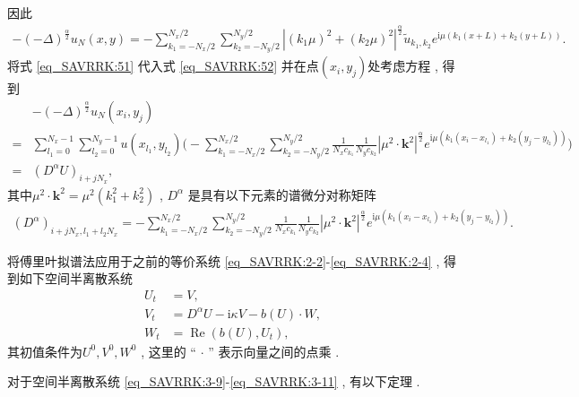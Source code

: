 因此
\begin{align}\label{eq_SAVRRK:52}
-(-\Delta)^{\frac{\alpha}{2}} u_{N}\left(x , y\right)=-\sum\limits_{k_{1}=-N_{x} / 2}^{N_{x} / 2} \sum\limits_{k_{2}=-N_{y} / 2}^{N_{y} / 2}\left|\left(k_{1} \mu\right)^{2}+\left(k_{2} \mu\right)^{2}\right|^{\frac{\alpha}{2}} \tilde{u}_{k_{1} , k_{2}} e^{\mathrm{i}\mu\left( k_{1} (x+L)+k_{2}(y+L)\right)} . 
\end{align}
将式 \eqref{eq_SAVRRK:51} 代入式 \eqref{eq_SAVRRK:52} 并在点$(x_i , y_j)$处考虑方程 , 得到
\begin{align}
&-(-\Delta)^{\frac{\alpha}{2}} u_{N}\left(x_{i} , y_{j}\right)\nonumber\\
=&\sum\limits_{l_{1}=0}^{N_{x}-1} \sum\limits_{l_{2}=0}^{N_{y}-1}u(x_{l_{1}} , y_{l_{2}})\Big(-\sum\limits_{k_{1}=-N_{x} / 2}^{N_{x} / 2} \sum\limits_{k_{2}=-N_{y} / 2}^{N_{y} / 2} \frac{1}{N_{x} c_{k_{1}}} \frac{1}{N_{y} c_{k_{2}}}\left|\mu^{2} \cdot \mathbf{k}^{2}\right|^{\frac{\alpha}{2}} e^{\mathrm{i} \mu\left(k_{1}\left(x_{i}-x_{l_{1}}\right)+k_{2}\left(y_{j}-y_{l_{2}}\right)\right)}\Big)\nonumber\\
=&\left(D^{\alpha}U\right)_{i+j N_{x}} , \label{eq_SAVRRK:53}
\end{align}
其中$\mu^{2} \cdot \mathbf{k}^{2}=\mu^{2}\left(k_{1}^{2}+k_{2}^{2}\right)$ , $D^{\alpha}$ 是具有以下元素的谱微分对称矩阵
\begin{align}\label{eq_SAVRRK:54}
\left(D^{\alpha}\right)_{i+j N_{x} , l_{1}+l_{2} N_{x}}=-\sum\limits_{k_{1}=-N_{x} / 2}^{N_{x} / 2} \sum\limits_{k_{2}=-N_{y} / 2}^{N_{y} / 2}\frac{1}{N_{x} c_{k_{1}}} \frac{1}{N_{y} c_{k_{2}}}\left|\mu^{2} \cdot \mathbf{k}^{2}\right|^{\frac{\alpha}{2}} e^{\mathrm{i}\mu\left(k_{1}\left(x_{i}-x_{l_{1}}\right)+k_{2}\left(y_{j}-y_{l_{2}}\right)\right)} . 
\end{align}

将傅里叶拟谱法应用于之前的等价系统 \eqref{eq_SAVRRK:2-2}-\eqref{eq_SAVRRK:2-4} , 得到如下空间半离散系统
\begin{align}
 U_t&=V , \label{eq_SAVRRK:3-9}\\
 V_t&=D^{\alpha} U-\mathrm{i}\kappa V- b(U) \cdot W , \label{eq_SAVRRK:3-10}\\
 W_t&=\operatorname{Re}\left(b(U) , U_t\right) , \label{eq_SAVRRK:3-11}
\end{align}
其初值条件为$U^0 , V^0 , W^0$ , 这里的 “ $\cdot$ ” 表示向量之间的点乘 . 

对于空间半离散系统 \eqref{eq_SAVRRK:3-9}-\eqref{eq_SAVRRK:3-11} , 有以下定理 . 

